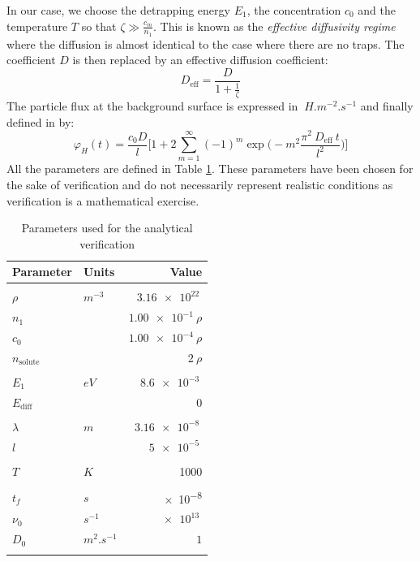 In our case, we choose the detrapping energy $E_1$, the concentration $c_0$ and the temperature $T$ so that $\zeta \gg \frac{c_m}{n_1}$.
This is known as the \textit{effective diffusivity regime} where the diffusion is almost identical to the case where there are no traps.
The coefficient $D$ is then replaced by an effective diffusion coefficient:
\begin{equation}
    D_\mathrm{eff} = \frac{D}{1+\frac{1}{\zeta}}
\end{equation}
The particle flux at the background surface is expressed in $\SI{}{H.m^{-2}.s^{-1}}$ and finally defined in  by:
\begin{equation}
    \varphi_H(t) = \frac{c_0 D}{l}\bigg[1+2\sum_{m=1}^{\infty}(-1)^m \exp\bigg(-m^2\frac{\pi^2 \:D_\mathrm{eff} \: t}{l^2}\bigg)\bigg]
\label{eq:flux analytical}
\end{equation}
All the parameters are defined in Table \ref{tab:parameters analytical verification}.
These parameters have been chosen for the sake of verification and do not necessarily represent realistic conditions as verification is a mathematical exercise.
\begin{table}
    \centering
    \begin{tabular}{p{2.3cm} p{2cm} r}
        Parameter & Units & Value \\
        \hline
        \\
        $\rho$ & $\si{m^{-3}}$ &$\SI{3.16e22}{}$ \\
        $n_1$ & & $\SI{1.00e-1}{} \rho$ \\
        $c_0$ & & $\SI{1.00e-4}{} \rho$\\
        $n_\mathrm{solute}$ & & $2 \:\rho$\\
        \\
        $E_1$ & $\si{eV}$ & $\SI{8.6e-3}{}$ \\
        $E_\mathrm{diff}$ & & $0$ \\
        \\
        $\lambda$ & $\si{m}$ & $\SI{3.16e-8}{}$  \\
        $l$ & & $\SI{5e-5}{}$\\
        \\
        $T$ & $\si{K}$ & 1000 \\
        \\
        $t_f$ & $\si{s}$ & \SI{e-8}{} \\
        $\nu_0$ & $\si{s^{-1}}$ & $\SI{e13}{}$ \\
        $D_0$ & $\si{m^2.s^{-1}}$ & $1$ \\
        \\
    \end{tabular}
    \caption{Parameters used for the analytical verification}
    \label{tab:parameters analytical verification}
\end{table}
